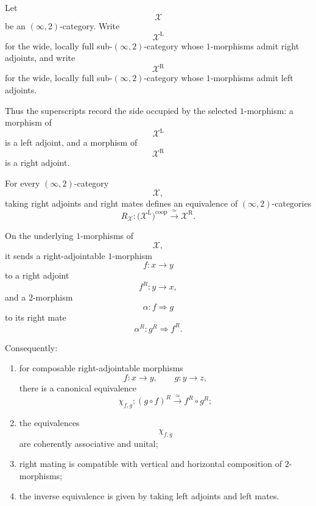 Let
\[
    \mathcal X
\]
be an $(\infty,2)$-category. Write
\[
    \mathcal X^{\mathrm L}
\]
for the wide, locally full sub-$(\infty,2)$-category whose
$1$-morphisms admit right adjoints, and write
\[
    \mathcal X^{\mathrm R}
\]
for the wide, locally full sub-$(\infty,2)$-category whose
$1$-morphisms admit left adjoints.

Thus the superscripts record the side occupied by the selected
$1$-morphism: a morphism of
\[
    \mathcal X^{\mathrm L}
\]
is a left adjoint, and a morphism of
\[
    \mathcal X^{\mathrm R}
\]
is a right adjoint.

\begin{theorem}
\label{thm:coherent-mate-calculus}
For every $(\infty,2)$-category
\[
    \mathcal X,
\]
taking right adjoints and right mates defines an equivalence of
$(\infty,2)$-categories
\[
    R_{\mathcal X}
    \colon
    \bigl(
        \mathcal X^{\mathrm L}
    \bigr)^{\mathrm{coop}}
    \xrightarrow{\;\simeq\;}
    \mathcal X^{\mathrm R}.
\]

On the underlying $1$-morphisms of
\[
    \mathcal X,
\]
it sends a right-adjointable $1$-morphism
\[
    f
    \colon
    x
    \longrightarrow
    y
\]
to a right adjoint
\[
    f^R
    \colon
    y
    \longrightarrow
    x,
\]
and a $2$-morphism
\[
    \alpha
    \colon
    f
    \Longrightarrow
    g
\]
to its right mate
\[
    \alpha^R
    \colon
    g^R
    \Longrightarrow
    f^R.
\]

Consequently:
\begin{enumerate}[label=(\roman*)]
    \item for composable right-adjointable morphisms
    \[
        f
        \colon
        x
        \longrightarrow
        y,
        \qquad
        g
        \colon
        y
        \longrightarrow
        z,
    \]
    there is a canonical equivalence
    \[
        \chi_{f,g}
        \colon
        (g\circ f)^R
        \xrightarrow{\;\simeq\;}
        f^R\circ g^R;
    \]

    \item the equivalences
    \[
        \chi_{f,g}
    \]
    are coherently associative and unital;

    \item right mating is compatible with vertical and horizontal
    composition of $2$-morphisms;

    \item the inverse equivalence is given by taking left adjoints and
    left mates.
\end{enumerate}
\end{theorem}

